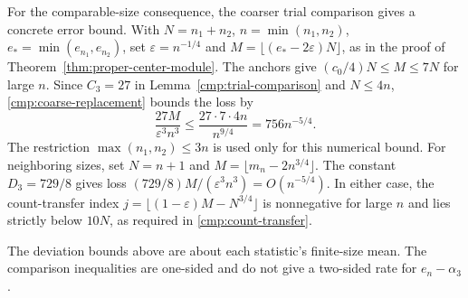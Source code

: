 For the comparable-size consequence, the coarser trial comparison gives
a concrete error bound.  With \(N=n_1+n_2\),
\(n=\min(n_1,n_2)\), \(e_*=\min(e_{n_1},e_{n_2})\), set
\(\varepsilon=n^{-1/4}\) and
\(M=\lfloor(e_*-2\varepsilon)N\rfloor\), as in the proof of
Theorem~\ref{thm:proper-center-module}.  The anchors give
\((c_0/4)N\le M\le7N\) for large \(n\).  Since \(C_3=27\) in
Lemma~\ref{cmp:trial-comparison} and \(N\le4n\),
\eqref{cmp:coarse-replacement} bounds the loss by
\begin{equation}\label{eq:prefix-756-loss}
 \frac{27M}{\varepsilon^3n^3}
 \le\frac{27\cdot7\cdot4n}{n^{9/4}}
 =756n^{-5/4}.
\end{equation}
The restriction \(\max(n_1,n_2)\le3n\) is used only for this numerical
bound.  For neighboring sizes, set \(N=n+1\) and
\(M=\lfloor m_n-2n^{3/4}\rfloor\).  The constant \(D_3=729/8\) gives loss
\((729/8)M/(\varepsilon^3n^3)=O(n^{-5/4})\).
In either case, the count-transfer index
\(j=\lfloor(1-\varepsilon)M-N^{3/4}\rfloor\) is nonnegative for
large \(n\) and lies strictly below \(10N\), as required in
\eqref{cmp:count-transfer}.

The deviation bounds above are about each statistic's finite-size mean.
The comparison inequalities are one-sided and do not give a two-sided
rate for \(e_n-\alpha_3\).
